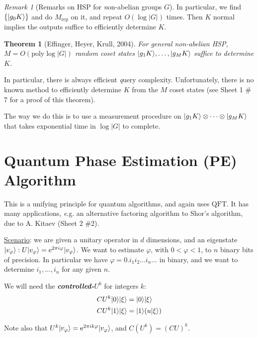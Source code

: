 \documentclass[]{article}
\DeclarePairedDelimiter\ket{\lvert}{\rangle}
\theoremstyle{custhm}
\theoremstyle{cusdef}
\theoremstyle{custhm}
\theoremstyle{custhm}
\theoremstyle{custhm}
\theoremstyle{custhm}
\newtheorem*{theorem*}{Theorem}
\theoremstyle{cusdef}
\theoremstyle{remark}
\newtheorem*{remark*}{Remark}
\newcommand{\e}{\mathrm{e}}
\newcommand{\undf}[1]{\textit{\textbf{#1}}}
\renewcommand{\it}[1]{\textit{#1}}
\renewcommand{\phi}{\varphi}
\newcommand{\qft}{\textrm{QFT}}
\newcommand{\poly}{\textrm{poly}}
\begin{document}
\begin{remark*}[Remarks on HSP for {\it non}-abelian groups $G$]
In particular, we find $\{\ket{g_0 K}\}$ and do $M_{\textrm{rep}}$ on it, and repeat $O(\log |G|)$ times. Then $K$ normal implies the outputs suffice to efficiently determine $K$.

\begin{theorem*}[Effinger, Heyer, Krull, 2004]
For general non-abelian HSP, $M = O(\poly \log |G|)$ random coset states $\ket{g_1 K},\dots,\ket{g_M K}$ suffice to determine $K$.
\end{theorem*}
 In particular, there is always efficient {\it query} complexity. Unfortunately, there is no known method to efficiently determine $K$ from the $M$ coset states (see Sheet 1 \# 7 for a proof of this theorem).
 
 The way we do this is to use a measurement procedure on $\ket{g_1K}\otimes \dots\otimes \ket{g_M K}$ that takes exponential time in $\log |G|$ to complete.
\end{remark*}

\section{Quantum Phase Estimation (PE) Algorithm}

This is a unifying principle for quantum algorithms, and again uses $\qft$. It has many applications, {\it e.g.} an alternative factoring algorithm to Shor's algorithm, due to A. Kitaev (Sheet 2 \#2).

\underline{Scenario}: we are given a unitary operator in $d$ dimensions, and an eigenstate $\ket{v_\phi}:U\ket{v_{\phi}} = \e^{2\pi i \phi}\ket{v_\phi}$. We want to estimate $\phi$, with $0 < \phi < 1$, to $n$ binary bits of precision. In particular we have $\phi = 0.i_1i_2\dots i_n\dots$ in binary, and we want to determine $i_1,\dots,i_n$ for any given $n$.

We will need the \undf{controlled-$U^k$} for integers $k$:
\begin{align*}
CU^k\ket{0}\ket{\xi} &= \ket{0}\ket{\xi}\\
CU^k\ket{1}\ket{\xi} &= \ket{1}(u\ket{\xi})\\
\end{align*}

Note also that $U^k\ket{v_\phi} = \e^{2\pi i k\phi}\ket{v_\phi}$, and $C(U^k) = (CU)^k$.
\end{document}
